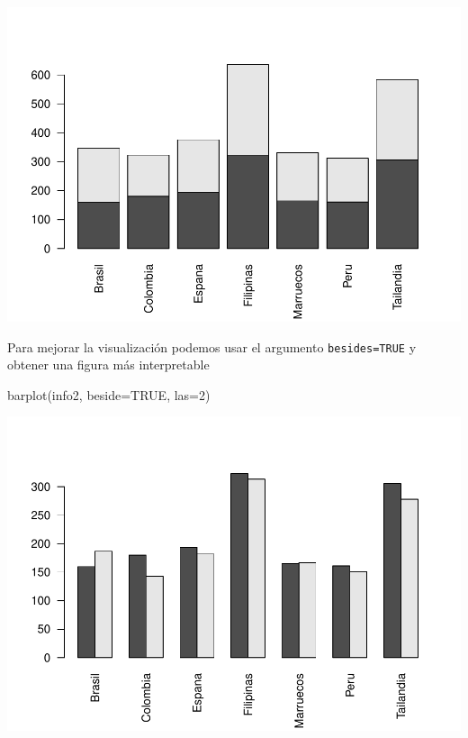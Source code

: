 \documentclass[
]{book}
\newenvironment{Shaded}{\begin{snugshade}}{\end{snugshade}}
\newcommand{\AttributeTok}[1]{\textcolor[rgb]{0.77,0.63,0.00}{#1}}
\newcommand{\ConstantTok}[1]{\textcolor[rgb]{0.00,0.00,0.00}{#1}}
\newcommand{\DecValTok}[1]{\textcolor[rgb]{0.00,0.00,0.81}{#1}}
\newcommand{\FunctionTok}[1]{\textcolor[rgb]{0.00,0.00,0.00}{#1}}
\newcommand{\NormalTok}[1]{#1}
\newcommand{\OtherTok}[1]{\textcolor[rgb]{0.56,0.35,0.01}{#1}}
\newcommand{\SpecialCharTok}[1]{\textcolor[rgb]{0.00,0.00,0.00}{#1}}
\begin{document}
\begin{Shaded}
\end{Shaded}

\includegraphics{fig/unnamed-chunk-102-1.pdf}

Para mejorar la visualización podemos usar el argumento \texttt{besides=TRUE} y obtener una figura más interpretable

\begin{Shaded}
\begin{Highlighting}[]
\FunctionTok{barplot}\NormalTok{(info2, }\AttributeTok{beside=}\ConstantTok{TRUE}\NormalTok{, }\AttributeTok{las=}\DecValTok{2}\NormalTok{)}
\end{Highlighting}
\end{Shaded}

\includegraphics{fig/unnamed-chunk-103-1.pdf}
\end{document}
